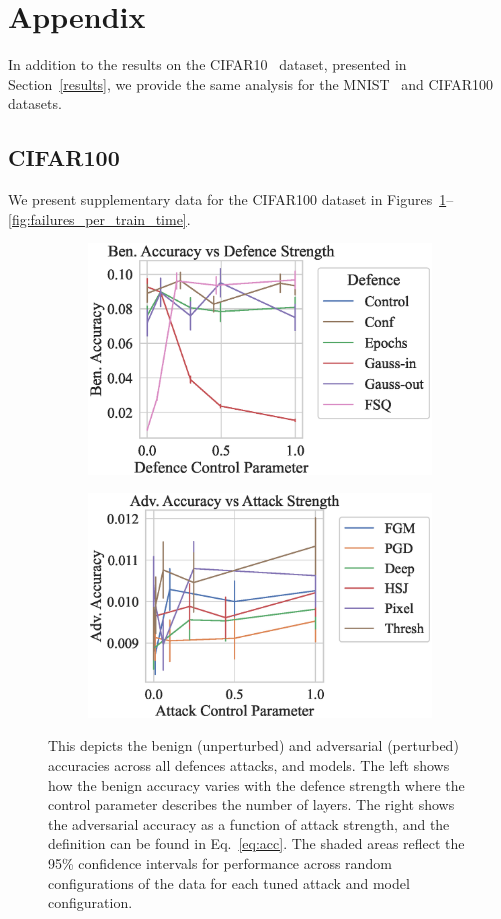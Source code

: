 \clearpage
\onecolumn
\section{Appendix}
\label{appendix}

In addition to the results on the CIFAR10~\citep{cifar} dataset, presented in Section~\ref{results}, we provide the same analysis for the MNIST~\citep{mnist} and CIFAR100~\citep{cifar} datasets.

\subsection{CIFAR100}

We present supplementary data for the CIFAR100 dataset in Figures~\ref{fig:strength}--\ref{fig:failures_per_train_time}.

\begin{figure}[h!]
    \centering
    \begin{subfigure}
        \centering
        \includegraphics[trim={0 20pt 0 10pt},clip,width=.45\textwidth]{cifar100/def_param_vs_accuracy.eps}
    \end{subfigure}
    \begin{subfigure}
        \centering
        \includegraphics[trim={0 20pt 0 10pt},clip,width=.45\textwidth]{cifar100/atk_param_vs_accuracy.eps}
    \end{subfigure}
    \caption{This depicts the benign (unperturbed) and adversarial (perturbed) accuracies across all defences attacks, and models. The left shows how the benign accuracy varies with the defence strength where the control parameter describes the number of layers. The right shows the adversarial accuracy as a function of attack strength, and the definition can be found in Eq.~\ref{eq:acc}. The shaded areas reflect the 95\% confidence intervals for performance across random configurations of the data for each tuned attack and model configuration.}
    \label{fig:strength}
\end{figure}

